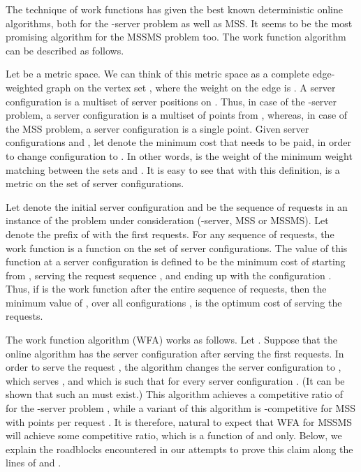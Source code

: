\documentclass[11pt]{article}
\theoremstyle{plain}\newtheorem{theorem}{Theorem}
\theoremstyle{definition}
\theoremstyle{remark}
\begin{document}
The technique of work functions has given the best known deterministic online algorithms, both for the -server problem as well as MSS. It seems to be the most promising algorithm for the MSSMS problem too. The work function algorithm can be described as follows.

Let  be a metric space. We can think of this metric space as a complete edge-weighted graph on the vertex set , where the weight on the edge  is . A server configuration is a multiset of server positions on . Thus, in case of the -server problem, a server configuration is a multiset of  points from , whereas, in case of the MSS problem, a server configuration is a single point. Given server configurations  and , let  denote the minimum cost that needs to be paid, in order to change configuration  to . In other words,  is the weight of the minimum weight matching between the sets  and . It is easy to see that with this definition,  is a metric on the set of server configurations.

Let  denote the initial server configuration and  be the sequence of requests in an instance of the problem under consideration (-server, MSS or MSSMS). Let  denote the prefix of  with the first  requests. For any sequence  of requests, the work function   
is a function on the set of server configurations. The value of this function at a server configuration  is defined to be the minimum cost of starting from , serving the request sequence , and ending up with the configuration . Thus, if  is the work function after the entire sequence of requests, then the minimum value of , over all configurations , is the optimum cost of serving the requests.

The work function algorithm (WFA) works as follows. Let . Suppose that the online algorithm has the server configuration  after serving the first  requests. In order to serve the request , the algorithm changes the server configuration to , which serves , and which is such that  for every server configuration . (It can be shown that such an  must exist.) This algorithm achieves a competitive ratio of  for the -server problem \cite{KoutsoupiasP95}, while a variant of this algorithm is -competitive for MSS with  points per request \cite{Burley96}. It is therefore, natural to expect that WFA for MSSMS will achieve some competitive ratio, which is a function of  and  only. Below, we explain the roadblocks encountered in our attempts to prove this claim along the lines of \cite{Burley96} and \cite{KoutsoupiasP95}.
\end{document}

